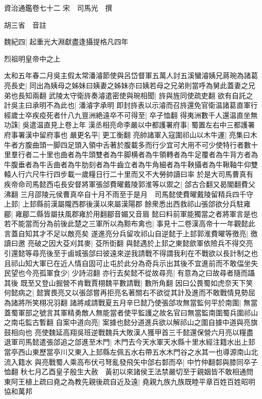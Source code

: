 資治通鑑卷七十二
宋　司馬光　撰

胡三省　音註

魏紀四|{
	起重光大淵獻盡逢攝提格凡四年}


烈祖明皇帝中之上

太和五年春二月吳主假太常潘濬節使與呂岱督軍五萬人討五溪蠻濬姨兄蔣琬為諸葛亮長史|{
	同出為姨母之姊妹曰姨妻之姊妹亦曰姨若母之兄弟則當呼為舅此蓋妻之兄弟也長知兩翻}
武陵太守衛旍奏濬遣密使與琬相聞|{
	旍與旌同使疏吏翻}
欲有自託之計吳主曰承明不為此也|{
	潘濬字承明}
即封旍表以示濬而召旍還免官衛温諸葛直軍行經歲士卒疾疫死者什八九亶洲絶遠卒不可得至|{
	卒子恤翻}
得夷洲數千人還温直坐無功誅|{
	吳遣温直見上卷上年}
漢丞相亮命李嚴以中都護署府事|{
	蜀置左右中三都護署府事署漢中留府事也}
嚴更名平|{
	更工衡翻}
亮帥諸軍入寇圍祁山以木牛運|{
	亮集曰木牛者方腹曲頭一脚四足頭入領中舌著於腹載多而行少宜可大用不可少使特行者數十里羣行者二十里也曲者為牛頭雙者為牛脚横者為牛領轉者為牛足覆者為牛背方者為牛腹垂者為牛舌曲者為牛肋刻者為牛齒立者為牛角細者為牛鞅攝者為牛鞦䩜牛仰雙轅人行六尺牛行四步載一歲糧日行二十里而又不大勞帥讀曰率}
於是大司馬曹真有疾帝命司馬懿西屯長安督將軍張郃費曜戴陵郭淮等以禦之|{
	郃古合翻又曷閣翻費父沸翻}
三月邵陵元侯曹真卒自十月不雨至于是月　司馬懿使費曜戴陵留精兵四千守上邽|{
	上邽縣前漢屬隴西郡後漢以來屬漢陽郡}
餘衆悉出西救祁山張郃欲分兵駐雍郿|{
	雍郿二縣皆屬扶風郡雍於用翻郿音媚又音眉}
懿曰料前軍能獨當之者將軍言是也若不能當而分為前後此楚之三軍所以為黥布禽也|{
	事見十二卷漢高帝十一年觀懿此言蓋自知其才不足以敵亮矣}
遂進亮分兵留攻祁山自逆懿于上邽郭淮費曜等徼亮|{
	徼讀曰邀}
亮破之因大芟刈其麥|{
	芟所衘翻}
與懿遇於上邽之東懿歛軍依險兵不得交亮引還懿等尋亮後至于鹵城張郃曰彼遠來逆我請戰不得謂我利在不戰欲以長計制之也且祁山知大軍已在近人情自固可止屯於此分為奇兵示出其後不宜進前而不敢偪坐失民望也今亮孤軍食少|{
	少詩沼翻}
亦行去矣懿不從故尋亮|{
	有意為之曰故尋者隨而躡其後}
既至又登山掘營不肯戰賈栩魏平數請戰|{
	數所角翻}
因曰公畏蜀如虎奈天下笑何懿病之|{
	懿實畏亮又以張郃嘗再拒亮名著關右不欲從其計及進而不敢戰情見勢屈為諸將所笑栩况羽翻}
諸將咸請戰夏五月辛巳懿乃使張郃攻無當監何平於南圍|{
	無當蓋蜀軍部之號言其軍精勇敵人無能當者使平監護之故名官曰無當監南圍蜀兵圍祁山之南屯監古暫翻}
自案中道向亮|{
	案據也懿分道進兵欲以解祁山之圍自據中道與亮旗鼓相向也}
亮使魏延高翔吳班逆戰魏兵大敗漢人獲甲首三千懿還保營六月亮以糧盡退軍司馬懿遣張郃追之郃進至木門|{
	木門去今天水軍天水縣十里水經注籍水出上邽當亭西山東歷當亭川又東入上邽縣左佩五水右帶五水木門谷之水其一也導源南山北流入籍水}
與亮戰蜀人乘高布伏弓弩亂發飛矢中郃右䣛而卒|{
	中竹仲翻䣛與膝同卒子恤翻}
秋七月乙酉皇子殷生大赦　黃初以來諸侯王法禁嚴切至于親姻皆不敢相通問東阿王植上疏曰堯之為教先親後疏自近及遠|{
	堯親九族九族既睦平章百姓百姓昭明協和萬邦}
